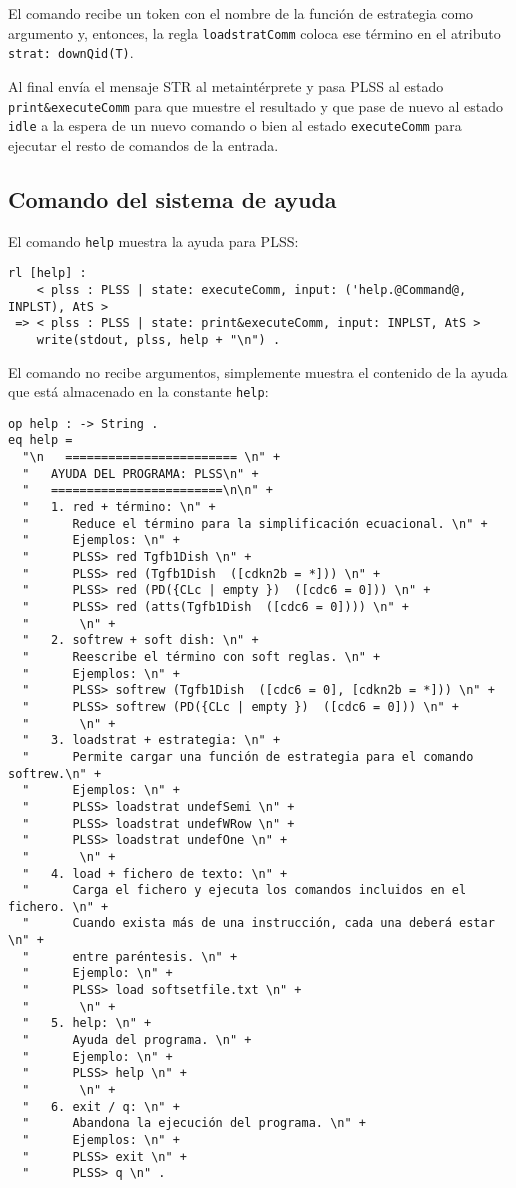 El comando recibe un token con el nombre de la función de estrategia como argumento y, entonces, la regla \texttt{loadstratComm} coloca ese término en el atributo \texttt{strat: downQid(T)}.

Al final envía el mensaje STR al metaintérprete y pasa PLSS al estado \texttt{print\&executeComm} para que muestre el resultado y que pase de nuevo al estado \texttt{idle} a la espera de un nuevo comando o bien al estado \texttt{executeComm} para ejecutar el resto de comandos de la entrada.
\medskip


\subsection{Comando del sistema de ayuda}

El comando \texttt{help} muestra la ayuda para PLSS:
\begin{lstlisting}[language=Maude]
 rl [help] :
    < plss : PLSS | state: executeComm, input: ('help.@Command@, INPLST), AtS >
 => < plss : PLSS | state: print&executeComm, input: INPLST, AtS >
    write(stdout, plss, help + "\n") .
\end{lstlisting}
\smallskip

El comando no recibe argumentos, simplemente muestra el contenido de la ayuda que está almacenado en la constante \texttt{help}:
\begin{lstlisting}[language=Maude]
op help : -> String .
eq help = 
  "\n   ======================== \n" +
  "   AYUDA DEL PROGRAMA: PLSS\n" +
  "   ========================\n\n" +
  "   1. red + término: \n" +
  "      Reduce el término para la simplificación ecuacional. \n" +
  "      Ejemplos: \n" +
  "      PLSS> red Tgfb1Dish \n" +
  "      PLSS> red (Tgfb1Dish  ([cdkn2b = *])) \n" +
  "      PLSS> red (PD({CLc | empty })  ([cdc6 = 0])) \n" +
  "      PLSS> red (atts(Tgfb1Dish  ([cdc6 = 0]))) \n" +
  "       \n" +
  "   2. softrew + soft dish: \n" +
  "      Reescribe el término con soft reglas. \n" +
  "      Ejemplos: \n" +
  "      PLSS> softrew (Tgfb1Dish  ([cdc6 = 0], [cdkn2b = *])) \n" +
  "      PLSS> softrew (PD({CLc | empty })  ([cdc6 = 0])) \n" +
  "       \n" +
  "   3. loadstrat + estrategia: \n" +
  "      Permite cargar una función de estrategia para el comando softrew.\n" +
  "      Ejemplos: \n" +
  "      PLSS> loadstrat undefSemi \n" +
  "      PLSS> loadstrat undefWRow \n" +
  "      PLSS> loadstrat undefOne \n" +
  "       \n" +
  "   4. load + fichero de texto: \n" +
  "      Carga el fichero y ejecuta los comandos incluidos en el fichero. \n" +
  "      Cuando exista más de una instrucción, cada una deberá estar \n" +
  "      entre paréntesis. \n" +
  "      Ejemplo: \n" +
  "      PLSS> load softsetfile.txt \n" +
  "       \n" +
  "   5. help: \n" +
  "      Ayuda del programa. \n" +
  "      Ejemplo: \n" +
  "      PLSS> help \n" +
  "       \n" +
  "   6. exit / q: \n" +
  "      Abandona la ejecución del programa. \n" +
  "      Ejemplos: \n" +
  "      PLSS> exit \n" +
  "      PLSS> q \n" .
\end{lstlisting}
\smallskip

